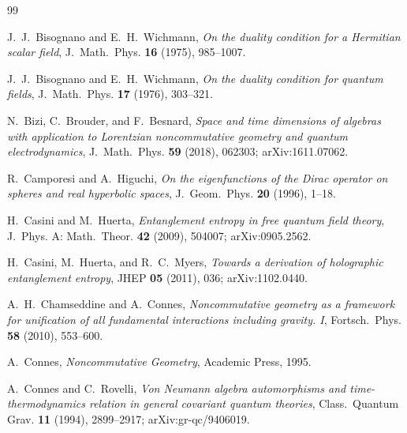 \documentclass[11pt,a4paper]{article}
\theoremstyle{plain}
\theoremstyle{definition}
\begin{document}

\begin{thebibliography}{99}

J.~J.~Bisognano and E.~H.~Wichmann,
\newblock \emph{On the duality condition for a Hermitian scalar field},
\newblock J.~Math.~Phys. \textbf{16} (1975), 985--1007.

J.~J.~Bisognano and E.~H.~Wichmann,
\newblock \emph{On the duality condition for quantum fields},
\newblock J.~Math.~Phys. \textbf{17} (1976), 303--321.

N.~Bizi, C.~Brouder, and F.~Besnard,
\newblock \emph{Space and time dimensions of algebras with
application to Lorentzian noncommutative geometry and quantum
electrodynamics},
\newblock J.~Math.~Phys. \textbf{59} (2018), 062303;
\newblock arXiv:1611.07062.

R.~Camporesi and A.~Higuchi,
\newblock \emph{On the eigenfunctions of the Dirac operator on
spheres and real hyperbolic spaces},
\newblock J.~Geom.~Phys. \textbf{20} (1996), 1--18.

H.~Casini and M.~Huerta,
\newblock \emph{Entanglement entropy in free quantum field theory},
\newblock J.~Phys. A: Math.~Theor. \textbf{42} (2009), 504007;
\newblock arXiv:0905.2562.

H.~Casini, M.~Huerta, and R.~C.~Myers,
\newblock \emph{Towards a derivation of holographic entanglement
entropy},
\newblock JHEP \textbf{05} (2011), 036;
\newblock arXiv:1102.0440.

A.~H.~Chamseddine and A.~Connes,
\newblock \emph{Noncommutative geometry as a framework for
unification of all fundamental interactions including gravity. I},
\newblock Fortsch.~Phys. \textbf{58} (2010), 553--600.

A.~Connes,
\newblock \emph{Noncommutative Geometry},
\newblock Academic Press, 1995.

A.~Connes and C.~Rovelli,
\newblock \emph{Von Neumann algebra automorphisms and
time-thermodynamics relation in general covariant quantum theories},
\newblock Class.~Quantum Grav. \textbf{11} (1994), 2899--2917;
\newblock arXiv:gr-qc/9406019.


\end{thebibliography}
\end{document}
